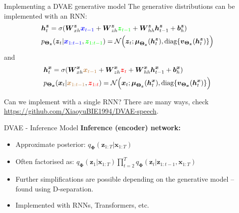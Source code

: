 \documentclass{beamer}
\newcommand{\bs}[1]{\boldsymbol{#1}}
\begin{document}
\begin{frame}{Implementing a DVAE generative model}
The generative distributions can be implemented with an RNN:
\begin{align}
 & {\color{black}\bs{h}_{t}^{\bs{z}}} = \sigma(\bs{W}_{xh}^{\bs{z}} {\color{blue}\bs{x}_{t-1}} + \bs{W}_{zh}^{\bs{z}} {\color{green}\bs{z}_{t-1}}  + \bs{W}_{hh}^{\bs{z}} {\color{black}\bs{h}_{t-1}^{\bs{z}}} + \bs{b}_h^{\bs{z}})\\
 & p_{\bs{\Theta}_{\color{black}\bs{z}}}({\color{black}\bs{z}_t} | {\color{blue}\bs{x}_{1:t-1}}, {\color{green}\bs{z}_{1:t-1}} ) = \mathcal{N}\Big({\color{black}\bs{z}_t}; \boldsymbol{\mu}_{\bs{\Theta}_{\color{black}\bs{z}}}( {\color{black}\bs{h}_{t}^{\bs{z}}} ), \text{diag}\{ \bs{v}_{\bs{\Theta}_{\color{black}\bs{z}}}( {\color{black}\bs{h}_{t}^{\bs{z}}}) \} \Big)
\end{align}
and
\begin{align}
 & {\color{black}\bs{h}_{t}^{\bs{x}}} = \sigma(\bs{W}_{xh}^{\bs{x}} {\color{brown}\bs{x}_{t-1}} + \bs{W}_{zh}^{\bs{x}} {\color{red}\bs{z}_{t}}  + \bs{W}_{hh}^{\bs{x}} {\color{black}\bs{h}_{t-1}^{\bs{x}}} + \bs{b}_h^{\bs{x}})\\
 & p_{\bs{\Theta}_{\color{black}\bs{x}}}({\color{black}\bs{x}_t} | {\color{brown}\bs{x}_{1:t-1}}, {\color{red}\bs{z}_{1:t}} ) = \mathcal{N}\Big({\color{black}\bs{x}_t}; \boldsymbol{\mu}_{\bs{\Theta}_{\color{black}\bs{z}}}( {\color{black}\bs{h}_{t}^{\bs{x}}} ), \text{diag}\{ \bs{v}_{\bs{\Theta}_{\color{black}\bs{x}}}( {\color{black}\bs{h}_{t}^{\bs{x}}}) \} \Big)
\end{align}\pause

Can we implement with a single RNN? \pause There are \alert{many ways}, check \url{https://github.com/XiaoyuBIE1994/DVAE-speech}.
\end{frame}

\begin{frame}{DVAE - Inference Model}
\textbf{Inference (encoder) network:}
\begin{itemize}
  \item Approximate posterior: $q_{\bs{\Phi}}(\bs{z}_{1:T}|\bs{x}_{1:T})$
  \item Often factorised as: $q_{\bs{\Phi}}(\bs{z}_1|\bs{x}_{1:T}) \prod_{t=2}^T q_{\bs{\Phi}}(\bs{z}_t|\bs{z}_{1:t-1},\bs{x}_{1:T})$
  \item Further simplifications are possible depending on the generative model -- found using D-separation.
  \item Implemented with RNNs, Transformers, etc.
\end{itemize}\vspace{3mm}
\end{frame}
\end{document}
